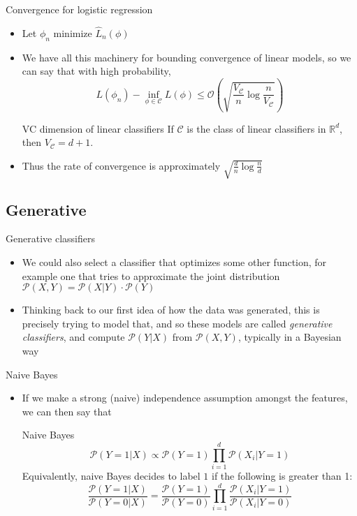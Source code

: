 \documentclass{beamer}
\renewcommand{\Pr}[1]{\mathcal{P} \left( #1 \right)}
\newcommand{\cls}{\mathcal{C}}
\newcommand{\R}{\mathbb{R}}
\newcommand{\pa}[1]{\left( #1 \right)}
\begin{document}
\begin{frame}{Convergence for logistic regression}
\begin{itemize}
\item Let $\phi_n$ minimize $\hat{L}_n(\phi)$
\item We have all this machinery for bounding convergence of linear models, so we can say that with high probability,
\[ L(\phi_n) - \inf_{\phi \in \cls}L(\phi) \leq \mathcal O \pa{ \sqrt{\frac{V_\cls}{n} \log\frac{n}{V_\cls}}} \]
\begin{block}{VC dimension of linear classifiers}
If $\cls$ is the class of linear classifiers in $\R^d$, then $V_\cls = d+1$.
\end{block}
\item Thus the rate of convergence is approximately $\sqrt{\frac dn \log \frac nd}$
\end{itemize}
\end{frame}

\subsection{Generative}
\begin{frame}{Generative classifiers}
\begin{itemize}
\item We could also select a classifier that optimizes some other function, for example one that tries to approximate the joint distribution $\Pr{X,Y} = \Pr{X|Y} \cdot \Pr{Y}$
\item Thinking back to our first idea of how the data was generated, this is precisely trying to model that, and so these models are called \emph{generative classifiers}, and compute $\Pr{Y|X}$ from $\Pr{X,Y}$, typically in a Bayesian way
\end{itemize}
\end{frame}

\begin{frame}{Naive Bayes}
\begin{itemize}
\item If we make a strong (naive) independence assumption amongst the features, we can then say that
\begin{block}{Naive Bayes}
\[ \Pr{Y=1|X} \propto \Pr{Y=1} \prod_{i=1}^d \Pr{X_i | Y=1} \]
Equivalently, naive Bayes decides to label $1$ if the following is greater than 1:
\[ \frac{\Pr{Y=1|X}}{\Pr{Y=0|X}} = \frac{\Pr{Y=1}}{\Pr{Y=0}} \prod_{i=1}^d \frac{\Pr{X_i|Y=1}}{\Pr{X_i|Y=0}} \]
\end{block}
\end{itemize}
\end{frame}
\end{document}
